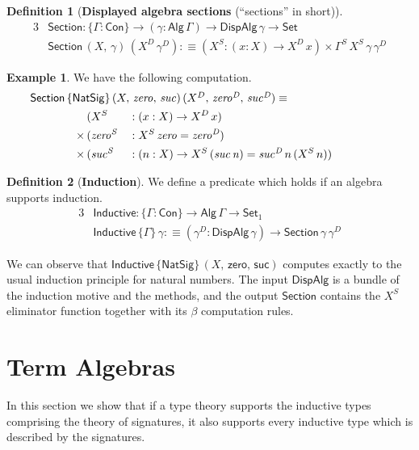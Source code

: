 \documentclass[12pt,a4paper,twoside,openany]{book}
\theoremstyle{remark}
\theoremstyle{definition}
\newtheorem{mydefinition}{Definition}
\newtheorem{myexample}{Example}
\newcommand{\mi}[1]{\mathit{#1}}
\newcommand{\ms}[1]{\mathsf{#1}}
\newcommand{\Con}{\mathsf{Con}}
\newcommand{\Set}{\mathsf{Set}}
\newcommand{\Alg}{\ms{Alg}}
\newcommand{\DispAlg}{\ms{DispAlg}}
\newcommand{\Section}{\ms{Section}}
\newcommand{\Inductive}{\ms{Inductive}}
\newcommand{\defn}{:\equiv}
\begin{document}
\begin{mydefinition}[\textbf{Displayed algebra sections} (``sections'' in short)]
\begin{alignat*}{3}
  & \Section : \{\Gamma : \Con\} \to (\gamma : \Alg\,\Gamma) \to \DispAlg\,\gamma \to \Set\\
  & \Section\,(X,\,\gamma)\,(X^D\,\gamma^D) \defn (X^S : (x : X) \to X^D\,x) \times \Gamma^S\,X^S\,\gamma\,\gamma^D
\end{alignat*}
\end{mydefinition}
\begin{myexample} We have the following computation.
\begin{alignat*}{3}
  & \hspace{-5em}\rlap{$\Section\,\{\ms{NatSig}\}\,(X,\,\mi{zero},\,\mi{suc})\,(X^D,\,\mi{zero^D},\,\mi{suc^D}) \equiv$}\\
              & (X^S &&: (x : X) \to X^D\,x)\\
      \times\,& (\mi{zero^S} &&: X^S\,\mi{zero} = \mi{zero^D})\\
      \times\,& (\mi{suc^S} &&: (n : X) \to X^S\,(\mi{suc\,n}) = \mi{suc^D}\,n\,(X^S\,n))
\end{alignat*}
\end{myexample}

\begin{mydefinition}[\textbf{Induction}]
We define a predicate which holds if an algebra supports induction.
\begin{alignat*}{3}
  & \Inductive : \{\Gamma : \Con\} \to \Alg\,\Gamma \to \Set_1\\
  & \Inductive\,\{\Gamma\}\,\gamma \defn
     (\gamma^D : \DispAlg\,\gamma) \to \Section\,\gamma\,\gamma^D
\end{alignat*}
\end{mydefinition}

We can observe that $\Inductive\,\{\ms{NatSig}\}\,(X,\,\ms{zero},\,\ms{suc})$
computes exactly to the usual induction principle for natural numbers. The input
$\DispAlg$ is a bundle of the induction motive and the methods, and the output
$\Section$ contains the $X^S$ eliminator function together with its $\beta$
computation rules.

\section{Term Algebras}

In this section we show that if a type theory supports the inductive types comprising
the theory of signatures, it also supports every inductive type which is described
by the signatures.
\end{document}
